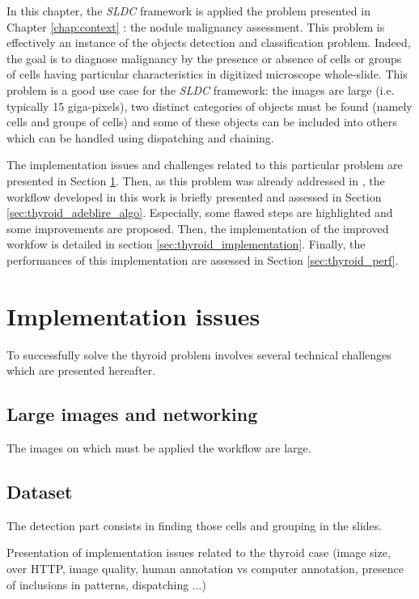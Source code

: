 In this chapter, the \textit{SLDC} framework is applied the problem presented in Chapter \ref{chap:context} : the nodule malignancy assessment. This problem is effectively an instance of the objects detection and classification problem. Indeed, the goal is to diagnose malignancy by the presence or absence of cells or groups of cells having particular characteristics in digitized microscope whole-slide. This problem is a good use case for the \textit{SLDC} framework: the images are large (i.e. typically 15 giga-pixels), two distinct categories of objects must be found (namely cells and groups of cells) and some of these objects can be included into others which can be handled using dispatching and chaining.  

The implementation issues and challenges related to this particular problem are presented in Section \ref{sec:thyroid_impl_issue}. Then, as this problem was already addressed in \cite{adeblire2013}, the workflow developed in this work is briefly presented and assessed in Section \ref{sec:thyroid_adeblire_algo}. Especially, some flawed steps are highlighted and some improvements are proposed. 
Then, the implementation of the improved workfow is detailed in section \ref{sec:thyroid_implementation}. Finally, the performances of this implementation are assessed in Section \ref{sec:thyroid_perf}.

\section{Implementation issues}
\label{sec:thyroid_impl_issue}
To successfully solve the thyroid problem involves several technical challenges which are presented hereafter.

\subsection{Large images and networking}
The images on which must be applied the workflow are large. 

\subsection{Dataset} 
The detection part consists in finding those cells and grouping in the slides. 




Presentation of implementation issues related to the thyroid case (image size, over HTTP, image quality, human annotation vs computer annotation, presence of inclusions in patterns, dispatching ...)

